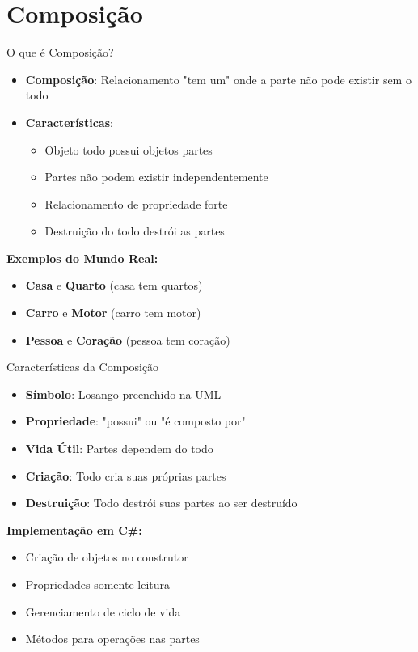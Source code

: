 \documentclass[aspectratio=169]{beamer}
\begin{document}
\section{Composição}

\begin{frame}{O que é Composição?}
\begin{itemize}
\item \textbf{Composição}: Relacionamento "tem um" onde a parte não pode existir sem o todo
\item \textbf{Características}:
\begin{itemize}
\item Objeto todo possui objetos partes
\item Partes não podem existir independentemente
\item Relacionamento de propriedade forte
\item Destruição do todo destrói as partes
\end{itemize}
\end{itemize}

\vspace{0.3cm}
\textbf{Exemplos do Mundo Real:}
\begin{itemize}
\item \textbf{Casa} e \textbf{Quarto} (casa tem quartos)
\item \textbf{Carro} e \textbf{Motor} (carro tem motor)
\item \textbf{Pessoa} e \textbf{Coração} (pessoa tem coração)
\end{itemize}
\end{frame}

\begin{frame}{Características da Composição}
\begin{itemize}
\item \textbf{Símbolo}: Losango preenchido na UML
\item \textbf{Propriedade}: "possui" ou "é composto por"
\item \textbf{Vida Útil}: Partes dependem do todo
\item \textbf{Criação}: Todo cria suas próprias partes
\item \textbf{Destruição}: Todo destrói suas partes ao ser destruído
\end{itemize}

\vspace{0.5cm}
\textbf{Implementação em C\#:}
\begin{itemize}
\item Criação de objetos no construtor
\item Propriedades somente leitura
\item Gerenciamento de ciclo de vida
\item Métodos para operações nas partes
\end{itemize}
\end{frame}
\end{document}
